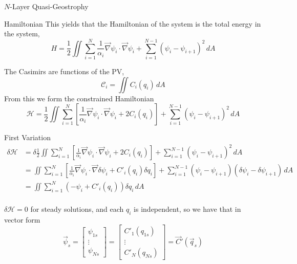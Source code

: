 \documentclass[12pt]{article}
\begin{document}
\begin{section}{$N$-Layer Quasi-Geostrophy}
\begin{subsection}{Hamiltonian}
        This yields that the Hamiltonian of the system is the total energy in the system,
        $$
        H = \frac12 \iint \sum_{i=1}^N \frac{1}{\alpha_i}\vec\nabla \psi_i \cdot \vec\nabla \psi_i + \sum_{i=1}^{N-1} (\psi_i - \psi_{i+1})^2 \, dA
        $$

        The Casimirs are functions of the PV,
        $$
        \mathcal{C}_i = \iint C_i(q_i) \, dA
        $$
        From this we form the constrained Hamiltonian
        \begin{equation}
        \mathcal{H} = \frac12 \iint \sum_{i=1}^N \left[ \frac{1}{\alpha_i} \vec\nabla \psi_i \cdot \vec\nabla \psi_i + 2C_i(q_i) \right] + \sum_{i=1}^{N-1} (\psi_i - \psi_{i+1})^2 \, dA
        \label{eqn:qg_Nl_h}
        \end{equation}
    \end{subsection}

    \begin{subsection}{First Variation}
        \begin{align*}
        \delta \mathcal{H} &= \delta\frac12 \iint \sum_{i=1}^N \left[ \frac{1}{\alpha_i} \vec\nabla \psi_i \cdot \vec\nabla \psi_i + 2C_i(q_i) \right] + \sum_{i=1}^{N-1} (\psi_i - \psi_{i+1})^2 \, dA \\
        &= \iint \sum_{i=1}^N \left[ \frac{1}{\alpha_i} \vec\nabla \psi_i \cdot \vec\nabla \delta\psi_i + C'_i(q_i) \delta q_i \right]+ \sum_{i=1}^{N-1} (\psi_i - \psi_{i+1})(\delta \psi_i - \delta \psi_{i+1}) \, dA \\
        &= \iint \sum_{i=1}^N (-\psi_i + C'_i(q_i)) \delta q_i\, dA \\
        \end{align*}

        $\delta \mathcal{H} = 0$ for steady solutions, and each $q_i$ is independent, so we have that in vector form
        \begin{equation}
        \vec \psi_s =
        \left[\begin{array}{c}
        \psi_{1s} \\
        \vdots \\
        \psi_{Ns}
        \end{array}\right]
        =
        \left[\begin{array}{c}
        C'_1(q_{1s}) \\
        \vdots \\
        C'_N(q_{Ns})
        \end{array}\right]
        =
        \vec C'(\vec q_s)
        \end{equation}
    \end{subsection}


\end{section}
\end{document}
